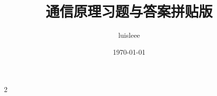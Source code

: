 \documentclass[10pt]{ctexart}
\begin{document}
\title{通信原理习题与答案拼贴版}
\author{luisleee}
\date{\today}
\begin{multicols*}{2}
\maketitle
\small
\tableofcontents
\footnotesize









\end{multicols*}
\end{document}
